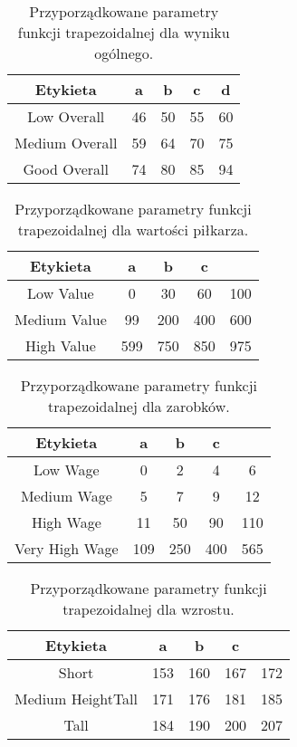 \documentclass{classrep}
\begin{document}
\begin{table}[H]
	\centering
	\begin{tabular}{c c c c c} 
		\hline
		\textbf{Etykieta} & \textbf{a} & \textbf{b} & \textbf{c} &  \textbf{d} \\ [0.5ex] 
		\hline
		\hline 
		Low Overall & 46 &  50 &  55 &  60\\
		Medium Overall & 59 &  64 &  70 &  75\\
		Good Overall &   74 &  80 &  85 &  94 \\
		\hline
	\end{tabular}
	\caption{Przyporządkowane parametry funkcji trapezoidalnej dla wyniku ogólnego.}
\end{table}

\begin{table}[H]
	\centering
	\begin{tabular}{c c c c c} 
		\hline
		\textbf{Etykieta} & \textbf{a} & \textbf{b} & \textbf{c}  \\ [0.5ex] 
		\hline
		\hline 
		Low Value & 0 &  30 &  60 &  100 \\ 
		Medium Value & 99 &  200 &  400 &  600 \\
		High Value &  599 &  750 &  850 &  975 \\
		\hline
	\end{tabular}
	\caption{Przyporządkowane parametry funkcji trapezoidalnej dla wartości piłkarza.}
\end{table}

\begin{table}[H]
	\centering
	\begin{tabular}{c c c c c} 
		\hline
		\textbf{Etykieta} & \textbf{a} & \textbf{b} & \textbf{c}  \\ [0.5ex] 
		\hline
		\hline 
		Low Wage & 0 &  2 &  4 &  6 \\ 
		Medium Wage & 5 &  7 &  9 &  12 \\
		High Wage &  11 &  50 &  90 &  110 \\
		Very High Wage &  109 &  250 &  400 &  565 \\
		\hline
	\end{tabular}
	\caption{Przyporządkowane parametry funkcji trapezoidalnej dla zarobków.}
\end{table}

\begin{table}[H]
	\centering
	\begin{tabular}{c c c c c} 
		\hline
		\textbf{Etykieta} & \textbf{a} & \textbf{b} & \textbf{c}  \\ [0.5ex] 
		\hline
		\hline 
		Short & 153 &  160 & 167 & 172 \\ 
		Medium HeightTall & 171 & 176 & 181 & 185 \\
		Tall & 184 & 190 & 200 & 207 \\
		\hline
	\end{tabular}
	\caption{Przyporządkowane parametry funkcji trapezoidalnej dla wzrostu.}
\end{table}
\end{document}

